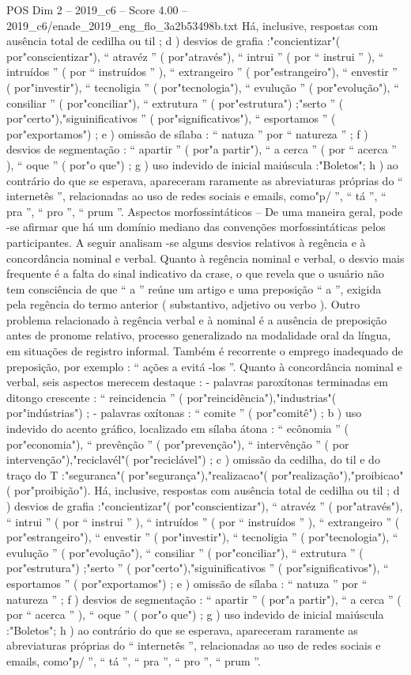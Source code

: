 \begin{textsample}{POS Dim 2 – 2019\_c6 – Score 4.00 – 2019\_c6/enade\_2019\_eng\_flo\_3a2b53498b.txt}
Há, inclusive, respostas com ausência total de cedilha ou til ; d ) desvios de grafia :"concientizar"( por"conscientizar"), “ atravéz ” ( por"através"), “ intrui ” ( por “ instrui ” ), “ intruídos ” ( por “ instruídos ” ), “ extrangeiro ” ( por"estrangeiro"), “ envestir ” ( por"investir"), “ tecnoligia ” ( por"tecnologia"), “ evulução ” ( por"evolução"), “ consiliar ” ( por"conciliar"), “ extrutura ” ( por"estrutura") ;"serto ” ( por"certo"),"siguinificativos ” ( por"significativos"), “ esportamos ” ( por"exportamos") ; e ) omissão de sílaba : “ natuza ” por “ natureza ” ; f ) desvios de segmentação : “ apartir ” ( por"a partir"), “ a cerca ” ( por “ acerca ” ), “ oque ” ( por"o que") ; g ) uso indevido de inicial maiúscula :"Boletos"; h ) ao contrário do que se esperava, apareceram raramente as abreviaturas próprias do “ internetês ”, relacionadas ao uso de redes sociais e emails, como"p/ ”, “ tá ”, “ pra ”, “ pro ”, “ prum ”.
Aspectos morfossintáticos – De uma maneira geral, pode -se afirmar que há um domínio mediano das convenções morfossintáticas pelos participantes.
A seguir analisam -se alguns desvios relativos à regência e à concordância nominal e verbal.
Quanto à regência nominal e verbal, o desvio mais frequente é a falta do sinal indicativo da crase, o que revela que o usuário não tem consciência de que “ a ” reúne um artigo e uma preposição “ a ”, exigida pela regência do termo anterior ( substantivo, adjetivo ou verbo ).
Outro problema relacionado à regência verbal e à nominal é a ausência de preposição antes de pronome relativo, processo generalizado na modalidade oral da língua, em situações de registro informal.
Também é recorrente o emprego inadequado de preposição, por exemplo : “ ações a evitá -los ”.
Quanto à concordância nominal e verbal, seis aspectos merecem destaque : - palavras paroxítonas terminadas em ditongo crescente : “ reincidencia ” ( por"reincidência"),"industrias"( por"indústrias") ; - palavras oxítonas : “ comite ” ( por"comitê") ; b ) uso indevido do acento gráfico, localizado em sílaba átona : “ ecônomia ” ( por"economia"), “ prevênção ” ( por"prevenção"), “ intervênção ” ( por intervenção"),"reciclavél"( por"reciclável") ; c ) omissão da cedilha, do til e do traço do T :"seguranca"( por"segurança"),"realizacao"( por"realização"),"proibicao"( por"proibição").
Há, inclusive, respostas com ausência total de cedilha ou til ; d ) desvios de grafia :"concientizar"( por"conscientizar"), “ atravéz ” ( por"através"), “ intrui ” ( por “ instrui ” ), “ intruídos ” ( por “ instruídos ” ), “ extrangeiro ” ( por"estrangeiro"), “ envestir ” ( por"investir"), “ tecnoligia ” ( por"tecnologia"), “ evulução ” ( por"evolução"), “ consiliar ” ( por"conciliar"), “ extrutura ” ( por"estrutura") ;"serto ” ( por"certo"),"siguinificativos ” ( por"significativos"), “ esportamos ” ( por"exportamos") ; e ) omissão de sílaba : “ natuza ” por “ natureza ” ; f ) desvios de segmentação : “ apartir ” ( por"a partir"), “ a cerca ” ( por “ acerca ” ), “ oque ” ( por"o que") ; g ) uso indevido de inicial maiúscula :"Boletos"; h ) ao contrário do que se esperava, apareceram raramente as abreviaturas próprias do “ internetês ”, relacionadas ao uso de redes sociais e emails, como"p/ ”, “ tá ”, “ pra ”, “ pro ”, “ prum ”.

\end{textsample}
